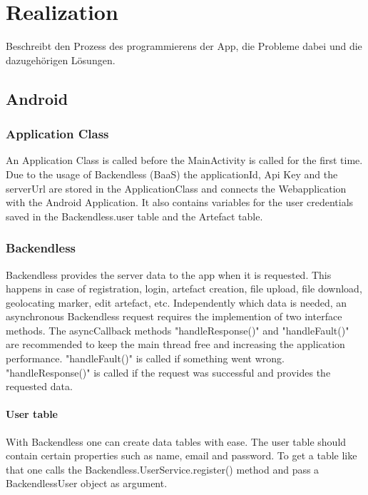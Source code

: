 \newpage
\chapter{Realization}
\label{cap:Realization}
Beschreibt den Prozess des programmierens der App, die Probleme dabei und die dazugehörigen Lösungen.

\section{Android}
\subsection{Application Class}
An Application Class is called before the MainActivity is called for the first time. Due to the usage of Backendless (BaaS) the applicationId, Api Key and the serverUrl are stored in the ApplicationClass and connects the Webapplication with the Android Application. It also contains variables for the user credentials saved in the Backendless.user table and the Artefact table. 

\subsection{Backendless}
Backendless provides the server data to the app when it is requested. This happens in case of registration, login, artefact creation, file upload, file download, geolocating marker, edit artefact, etc.
Independently which data is needed, an asynchronous Backendless request requires the implemention of two interface methods. The asyncCallback methods "handleResponse()" and "handleFault()" are recommended to keep the main thread free and increasing the application performance. "handleFault()" is called if something went wrong. "handleResponse()" is called if the request was successful and provides the requested data.

\subsubsection{User table}
With Backendless one can create data tables with ease. The user table should contain certain properties such as name, email and password. To get a table like that one calls the Backendless.UserService.register() method and pass a BackendlessUser object as argument.


